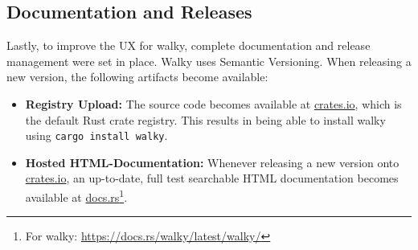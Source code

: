 \subsection{Documentation and Releases}
Lastly, to improve the \ac{UX} for walky, complete documentation and release management were set in place. Walky uses Semantic Versioning. When releasing a new version, the following artifacts become available:
\begin{itemize}
\item \textbf{Registry Upload:} The source code becomes available at \url{crates.io}, which is the default Rust crate registry. This results in being able to install walky using \texttt{cargo install walky}.
\item \textbf{Hosted HTML-Documentation:} Whenever releasing a new version onto \url{crates.io}, an up-to-date, full test searchable HTML documentation becomes available at \url{docs.rs}\footnote{For walky: \url{https://docs.rs/walky/latest/walky/}}.
\end{itemize}
